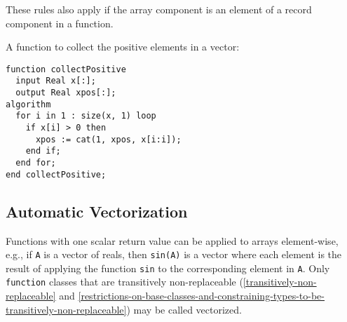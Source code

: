 These rules also apply if the array component is an element of a record
component in a function.

\begin{example}
A function to collect the positive elements in a vector:
\begin{lstlisting}[language=modelica]
function collectPositive
  input Real x[:];
  output Real xpos[:];
algorithm
  for i in 1 : size(x, 1) loop
    if x[i] > 0 then
      xpos := cat(1, xpos, x[i:i]);
    end if;
  end for;
end collectPositive;
\end{lstlisting}
\end{example}

\subsection{Automatic Vectorization}\label{scalar-functions-applied-to-array-arguments}\label{automatic-vectorization}

Functions with one scalar return value can be applied to arrays element-wise, e.g., if \lstinline!A! is a vector of reals, then \lstinline!sin(A)! is a vector where each element is the result of applying the function \lstinline!sin! to the corresponding element in \lstinline!A!.
Only \lstinline!function! classes that are transitively non-replaceable (\cref{transitively-non-replaceable} and \cref{restrictions-on-base-classes-and-constraining-types-to-be-transitively-non-replaceable}) may be called vectorized.

